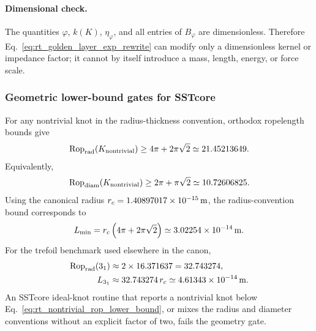 \paragraph{Dimensional check.}
The quantities \(\varphi\), \(k(K)\), \(\eta_\varphi\), and all entries of
\(B_\varphi\) are dimensionless.  Therefore
Eq.~\eqref{eq:rt_golden_layer_exp_rewrite} can modify only a dimensionless
kernel or impedance factor; it cannot by itself introduce a mass, length,
energy, or force scale.

\subsubsection{Geometric lower-bound gates for SSTcore}
For any nontrivial knot in the radius-thickness convention, orthodox
ropelength bounds give
\begin{align}
    \operatorname{Rop}_{\rm rad}(K_{\rm nontrivial})
    \ge
    4\pi+2\pi\sqrt2
    \simeq 21.45213649 .
    \label{eq:rt_nontrivial_rop_lower_bound}
\end{align}
Equivalently,
\begin{align}
    \operatorname{Rop}_{\rm diam}(K_{\rm nontrivial})
    \ge
    2\pi+\pi\sqrt2
    \simeq 10.72606825 .
    \label{eq:rt_nontrivial_rop_diam_bound}
\end{align}
Using the canonical radius $r_c=1.40897017\times10^{-15}\,\mathrm{m}$, the
radius-convention bound corresponds to
\begin{align}
    L_{\min}
    =
    r_c\left(4\pi+2\pi\sqrt2\right)
    \simeq
    3.02254\times10^{-14}\,\mathrm{m} .
    \label{eq:rt_nontrivial_physical_length_bound}
\end{align}
For the trefoil benchmark used elsewhere in the canon,
\begin{align}
    \operatorname{Rop}_{\rm rad}(3_1)
    &\approx 2\times16.371637=32.743274,\\
    L_{3_1}
    &\approx
    32.743274\,r_c
    \simeq
    4.61343\times10^{-14}\,\mathrm{m} .
    \label{eq:rt_trefoil_physical_length_benchmark}
\end{align}
An SSTcore ideal-knot routine that reports a nontrivial knot below
Eq.~\eqref{eq:rt_nontrivial_rop_lower_bound}, or mixes the radius and diameter
conventions without an explicit factor of two, fails the geometry gate.

